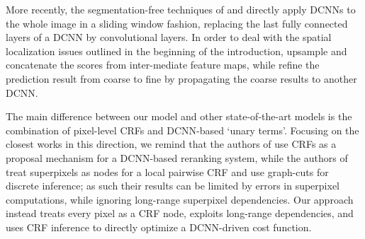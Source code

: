 
More recently, the segmentation-free techniques of \citet{long2014fully} and \cite{eigen2014predicting} directly apply DCNNs to the whole image in a sliding window fashion, replacing the last fully connected layers of a DCNN  by convolutional layers. In order to deal with the spatial localization issues outlined in the beginning of the introduction, \citet{long2014fully} upsample and concatenate the scores from inter-mediate feature maps, while \citet{eigen2014predicting} refine the prediction result from coarse to fine by propagating the coarse results to another DCNN. 


The main difference between our model and other state-of-the-art models is the combination of pixel-level CRFs and DCNN-based `unary terms'. Focusing on the closest    works in this direction, we remind  that  the authors of \citet{cogswell2014combining} use CRFs as a proposal mechanism for a DCNN-based reranking system, while the authors of  
\citet{farabet2013learning} treat superpixels as  nodes for a local pairwise CRF and use graph-cuts for discrete inference; as such their results can be limited by errors in superpixel computations, while ignoring  long-range superpixel dependencies. Our approach instead treats every pixel as a CRF node, exploits long-range dependencies, and uses  CRF inference to directly optimize a DCNN-driven cost function. 





